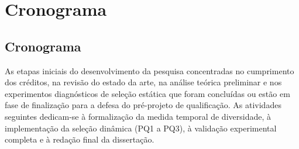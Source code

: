 \chapter{Cronograma}

\section{Cronograma}

As etapas iniciais do desenvolvimento da pesquisa concentradas no cumprimento dos créditos, na revisão do estado da arte, na análise teórica preliminar e nos experimentos diagnósticos de seleção estática que foram concluídas ou estão em fase de finalização para a defesa do pré-projeto de qualificação. As atividades seguintes dedicam-se à formalização da medida temporal de diversidade, à implementação da seleção dinâmica (PQ1 a PQ3), à validação experimental completa e à redação final da dissertação.

